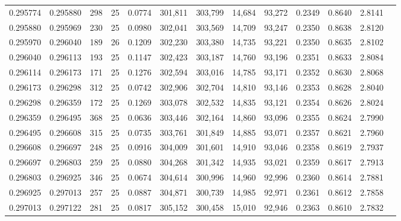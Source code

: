 \begin{tabular}{rrrrrrrrrrrrr}
0.295774 & 0.295880 &   298 &  25 &                                     0.0774 & 301,811 & 303,799 &  14,684 &  93,272 & 0.2349 & 0.8640 & 2.8141 \\
0.295880 & 0.295969 &   230 &  25 &                                     0.0980 & 302,041 & 303,569 &  14,709 &  93,247 & 0.2350 & 0.8638 & 2.8120 \\
0.295970 & 0.296040 &   189 &  26 &                                     0.1209 & 302,230 & 303,380 &  14,735 &  93,221 & 0.2350 & 0.8635 & 2.8102 \\
0.296040 & 0.296113 &   193 &  25 &                                     0.1147 & 302,423 & 303,187 &  14,760 &  93,196 & 0.2351 & 0.8633 & 2.8084 \\
0.296114 & 0.296173 &   171 &  25 &                                     0.1276 & 302,594 & 303,016 &  14,785 &  93,171 & 0.2352 & 0.8630 & 2.8068 \\
0.296173 & 0.296298 &   312 &  25 &                                     0.0742 & 302,906 & 302,704 &  14,810 &  93,146 & 0.2353 & 0.8628 & 2.8040 \\
0.296298 & 0.296359 &   172 &  25 &                                     0.1269 & 303,078 & 302,532 &  14,835 &  93,121 & 0.2354 & 0.8626 & 2.8024 \\
0.296359 & 0.296495 &   368 &  25 &                                     0.0636 & 303,446 & 302,164 &  14,860 &  93,096 & 0.2355 & 0.8624 & 2.7990 \\
0.296495 & 0.296608 &   315 &  25 &                                     0.0735 & 303,761 & 301,849 &  14,885 &  93,071 & 0.2357 & 0.8621 & 2.7960 \\
0.296608 & 0.296697 &   248 &  25 &                                     0.0916 & 304,009 & 301,601 &  14,910 &  93,046 & 0.2358 & 0.8619 & 2.7937 \\
0.296697 & 0.296803 &   259 &  25 &                                     0.0880 & 304,268 & 301,342 &  14,935 &  93,021 & 0.2359 & 0.8617 & 2.7913 \\
0.296803 & 0.296925 &   346 &  25 &                                     0.0674 & 304,614 & 300,996 &  14,960 &  92,996 & 0.2360 & 0.8614 & 2.7881 \\
0.296925 & 0.297013 &   257 &  25 &                                     0.0887 & 304,871 & 300,739 &  14,985 &  92,971 & 0.2361 & 0.8612 & 2.7858 \\
0.297013 & 0.297122 &   281 &  25 &                                     0.0817 & 305,152 & 300,458 &  15,010 &  92,946 & 0.2363 & 0.8610 & 2.7832 \\

\end{tabular}
